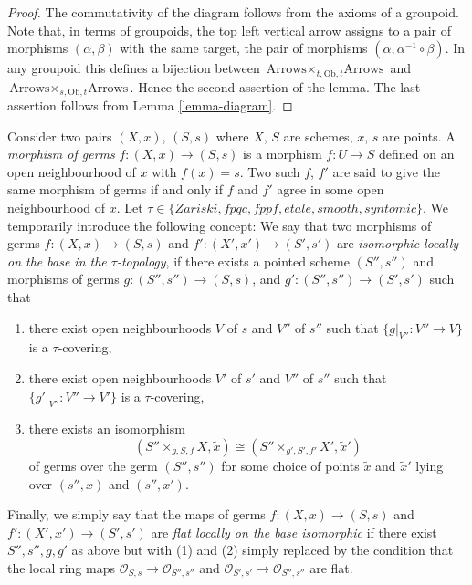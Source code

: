 \begin{proof}
The commutativity of the diagram follows from the axioms of a groupoid.
Note that, in terms of groupoids, the top left vertical arrow assigns to
a pair of morphisms $(\alpha, \beta)$ with the same target, the pair
of morphisms $(\alpha, \alpha^{-1} \circ \beta)$. In any groupoid
this defines a bijection between
$\text{Arrows} \times_{t, \text{Ob}, t} \text{Arrows}$
and
$\text{Arrows} \times_{s, \text{Ob}, t} \text{Arrows}$. Hence the second
assertion of the lemma.
The last assertion follows from Lemma \ref{lemma-diagram}.
\end{proof}

\noindent
Consider two pairs $(X, x)$, $(S, s)$
where $X$, $S$ are schemes, $x$, $s$ are points.
A {\it morphism of germs} $f : (X, x) \to (S, s)$
is a morphism $f : U \to S$ defined on an open neighbourhood
of $x$ with $f(x) = s$. Two such
$f$, $f'$ are said to give the same morphism of germs
if and only if $f$ and $f'$ agree in some open neighbourhood of $x$.
Let $\tau \in \{Zariski, fpqc, fppf, etale, smooth, syntomic\}$.
We temporarily
introduce the following concept: We say that two morphisms
of germs $f : (X, x) \to (S, s)$ and $f' : (X', x') \to (S', s')$
are {\it isomorphic locally on the base in the $\tau$-topology},
if there exists a pointed scheme $(S'', s'')$ and morphisms of germs
$g : (S'', s'') \to (S, s)$, and $g' : (S'', s'') \to (S', s')$
such that
\begin{enumerate}
\item there exist open neighbourhoods $V$ of $s$
and $V''$ of $s''$ such that $\{g|_{V''} : V'' \to V\}$ is
a $\tau$-covering,
\item there exist open neighbourhoods $V'$ of $s'$
and $V''$ of $s''$ such that $\{g'|_{V''} : V'' \to V'\}$ 
is a $\tau$-covering,
\item there exists an isomorphism
$$
(S'' \times_{g, S, f} X, \tilde x)
\cong
(S'' \times_{g', S', f'} X', \tilde  x')
$$
of germs over the germ $(S'', s'')$ for some choice of points
$\tilde x$ and $\tilde x'$ lying over $(s'', x)$ and $(s'', x')$.
\end{enumerate}
Finally, we simply say that the maps of germs
$f : (X, x) \to (S, s)$ and $f' : (X', x') \to (S', s')$
are {\it flat locally on the base isomorphic} if there exist
$S'', s'', g, g'$ as above but with (1) and (2) simply replaced by
the condition that the local ring maps
$\mathcal{O}_{S, s} \to \mathcal{O}_{S'', s''}$
and $\mathcal{O}_{S', s'} \to \mathcal{O}_{S'', s''}$ are flat.

